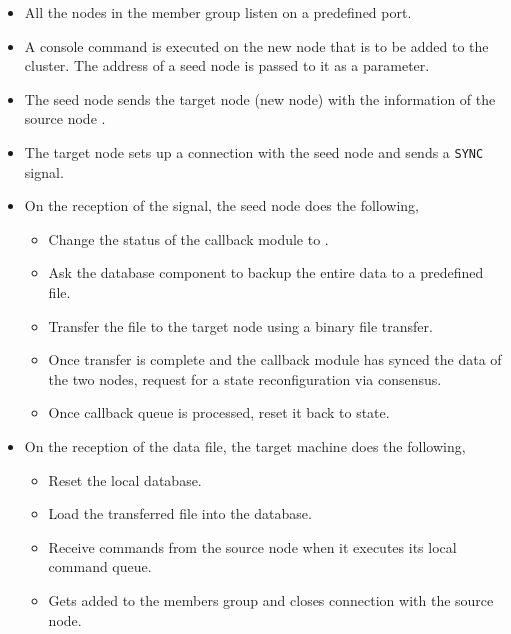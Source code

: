 \begin{itemize}
  \item All the nodes in the member group listen on a predefined port.
  \item A console command is executed on the new node that is to be added to the
    cluster. The address of a seed node%
     is passed to it as a parameter.
  \item The seed node sends the target node (new node) with the information of
    the source node%
    .
  \item The target node sets up a  connection with the seed node and
    sends a \texttt{SYNC}%
     signal.
  \item On the reception of the signal, the seed node does the following,
    \begin{itemize}
      \item Change the status of the callback module to .
      \item Ask the database component to backup the entire data to a
        predefined file.
      \item Transfer the file to the target node using a binary file transfer.
      \item Once transfer is complete and the callback module has synced
        the data of the two nodes, request for a state reconfiguration via
        consensus.
      \item Once callback queue is processed, reset it back to 
        state.
    \end{itemize}
  \item On the reception of the data file, the target machine does the
    following,
    \begin{itemize}
      \item Reset the local database.
      \item Load the transferred file into the database.
      \item Receive commands from the source node when it executes its local
        command queue.
      \item Gets added to the members group and closes connection with the
        source node.
    \end{itemize}
\end{itemize}

